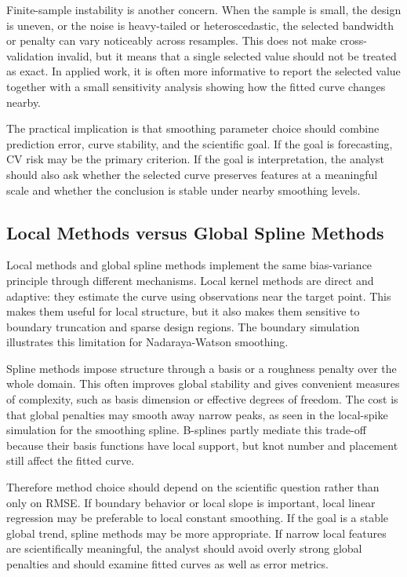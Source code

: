 \documentclass[12pt,a4paper]{article}
\begin{document}
Finite-sample instability is another concern. When the sample is small, the design is uneven, or the noise is heavy-tailed or heteroscedastic, the selected bandwidth or penalty can vary noticeably across resamples. This does not make cross-validation invalid, but it means that a single selected value should not be treated as exact. In applied work, it is often more informative to report the selected value together with a small sensitivity analysis showing how the fitted curve changes nearby.

The practical implication is that smoothing parameter choice should combine prediction error, curve stability, and the scientific goal. If the goal is forecasting, CV risk may be the primary criterion. If the goal is interpretation, the analyst should also ask whether the selected curve preserves features at a meaningful scale and whether the conclusion is stable under nearby smoothing levels.

\subsection{Local Methods versus Global Spline Methods}

Local methods and global spline methods implement the same bias-variance principle through different mechanisms. Local kernel methods are direct and adaptive: they estimate the curve using observations near the target point. This makes them useful for local structure, but it also makes them sensitive to boundary truncation and sparse design regions. The boundary simulation illustrates this limitation for Nadaraya-Watson smoothing.

Spline methods impose structure through a basis or a roughness penalty over the whole domain. This often improves global stability and gives convenient measures of complexity, such as basis dimension or effective degrees of freedom. The cost is that global penalties may smooth away narrow peaks, as seen in the local-spike simulation for the smoothing spline. B-splines partly mediate this trade-off because their basis functions have local support, but knot number and placement still affect the fitted curve.

Therefore method choice should depend on the scientific question rather than only on RMSE. If boundary behavior or local slope is important, local linear regression may be preferable to local constant smoothing. If the goal is a stable global trend, spline methods may be more appropriate. If narrow local features are scientifically meaningful, the analyst should avoid overly strong global penalties and should examine fitted curves as well as error metrics.
\end{document}
